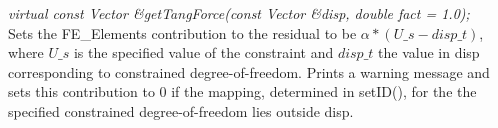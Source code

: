 {\em virtual const Vector \&getTangForce(const Vector \&disp, double
fact = 1.0);    }\\
Sets the FE\_Elements contribution to the residual to be
$\alpha * (U\_s - disp\_t)$, where $U\_s$ is the specified value of the
constraint and $disp\_t$ the value in \p disp
corresponding to constrained degree-of-freedom. Prints a warning
message and sets this contribution to $0$ if the mapping, determined in
setID(), for the the specified constrained degree-of-freedom lies 
outside \p disp. \\  










